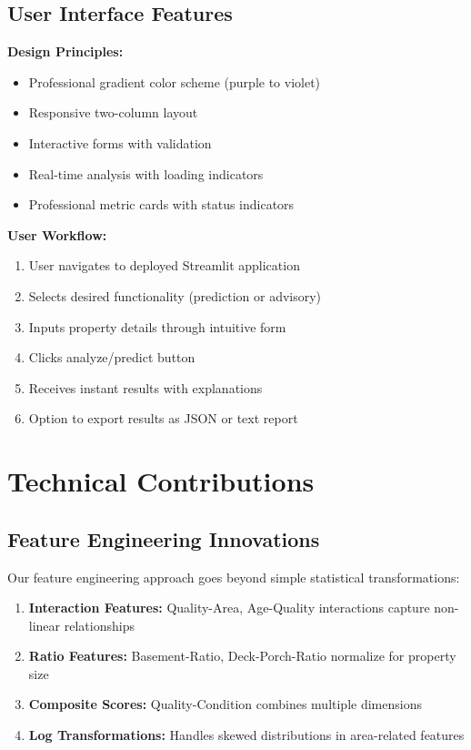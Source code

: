 \documentclass[11pt,a4paper]{article}
\begin{document}
\subsection{User Interface Features}

\textbf{Design Principles:}
\begin{itemize}
    \item Professional gradient color scheme (purple to violet)
    \item Responsive two-column layout
    \item Interactive forms with validation
    \item Real-time analysis with loading indicators
    \item Professional metric cards with status indicators
\end{itemize}

\textbf{User Workflow:}

\begin{enumerate}
    \item User navigates to deployed Streamlit application
    \item Selects desired functionality (prediction or advisory)
    \item Inputs property details through intuitive form
    \item Clicks analyze/predict button
    \item Receives instant results with explanations
    \item Option to export results as JSON or text report
\end{enumerate}

\pagebreak

\section{Technical Contributions}

\subsection{Feature Engineering Innovations}

Our feature engineering approach goes beyond simple statistical transformations:

\begin{enumerate}
    \item \textbf{Interaction Features:} Quality-Area, Age-Quality interactions capture non-linear relationships
    \item \textbf{Ratio Features:} Basement-Ratio, Deck-Porch-Ratio normalize for property size
    \item \textbf{Composite Scores:} Quality-Condition combines multiple dimensions
    \item \textbf{Log Transformations:} Handles skewed distributions in area-related features
\end{enumerate}
\end{document}
